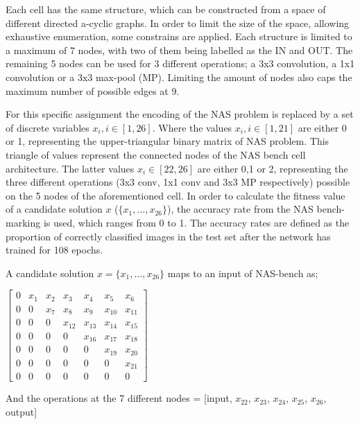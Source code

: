 \documentclass{article}
\begin{document}
Each cell has the same structure, which can be constructed from a space of different directed a-cyclic graphs.
In order to limit the size of the space, allowing exhaustive enumeration, some constrains are applied.
Each structure is limited to a maximum of 7 nodes, with two of them being labelled as the IN and OUT.
The remaining 5 nodes can be used for 3 different operations; a 3x3 convolution, a 1x1 convolution or a 3x3 max-pool (MP).
Limiting the amount of nodes also caps the maximum number of possible edges at 9.

For this specific assignment the encoding of the NAS problem is replaced by a set of discrete variables $x_i, i \in [1, 26]$.
Where the values $x_i, i \in [1, 21]$ are either 0 or 1, representing the upper-triangular binary matrix of NAS problem.
This triangle of values represent the connected nodes of the NAS bench cell architecture.
The latter values $x_i \in [22, 26]$ are either 0,1 or 2, representing the three different operations (3x3 conv, 1x1 conv and 3x3 MP respectively) possible on the 5 nodes of the aforementioned cell.
In order to calculate the fitness value of a candidate solution $x$ ($\{x_1, \dots, x_26\}$), the accuracy rate from the NAS bench-marking is used, which ranges from 0 to 1.
The accuracy rates are defined as the proportion of correctly classified images in the test set after the network has trained for 108 epochs.

A candidate solution $x = \{x_1, \dots , x_{26}\}$ maps to an input of NAS-bench as; 

$ \begin{bmatrix}
0 & x_1 & x_2 & x_3    & x_4    & x_5    & x_6    \\
0 & 0   & x_7 & x_8    & x_9    & x_{10} & x_{11} \\
0 & 0   & 0   & x_{12} & x_{13} & x_{14} & x_{15} \\
0 & 0   & 0   & 0      & x_{16} & x_{17} & x_{18} \\
0 & 0   & 0   & 0      & 0      & x_{19} & x_{20} \\
0 & 0   & 0   & 0      & 0      & 0      & x_{21} \\
0 & 0   & 0   & 0      & 0      & 0      & 0 
\end{bmatrix}  $

And the operations at the 7 different nodes = [input, $x_{22}$, $x_{23}$, $x_{24}$, $x_{25}$, $x_{26}$, output]


\end{document}
